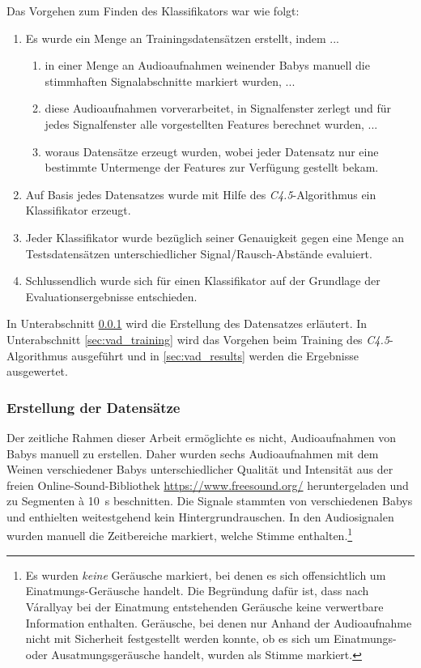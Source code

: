 \pagebreak

Das Vorgehen zum Finden des Klassifikators war wie folgt:
\begin{enumerate}
\item Es wurde ein Menge an Trainingsdatensätzen erstellt, indem ...
	\begin{enumerate}[label*=\arabic*.]
	\item in einer Menge an Audioaufnahmen weinender Babys manuell die stimmhaften Signalabschnitte markiert wurden, ...
	\item diese Audioaufnahmen vorverarbeitet, in Signalfenster zerlegt und für jedes Signalfenster alle vorgestellten Features berechnet wurden, ...
	\item woraus Datensätze erzeugt wurden, wobei jeder Datensatz nur eine bestimmte Untermenge der Features zur Verfügung gestellt bekam.
	\end{enumerate}
\item Auf Basis jedes Datensatzes wurde mit Hilfe des \emph{C4.5}-Algorithmus ein Klassifikator erzeugt.
\item Jeder Klassifikator wurde bezüglich seiner Genauigkeit gegen eine Menge an Testsdatensätzen unterschiedlicher Signal/Rausch-Abstände evaluiert.
\item Schlussendlich wurde sich für einen Klassifikator auf der Grundlage der Evaluationsergebnisse entschieden.
\end{enumerate}

In Unterabschnitt \ref{sec:vad_database} wird die Erstellung des Datensatzes erläutert. In Unterabschnitt \ref{sec:vad_training} wird das Vorgehen beim Training des \emph{C4.5}-Algorithmus ausgeführt und in \autoref{sec:vad_results} werden die Ergebnisse ausgewertet.

\subsubsection{Erstellung der Datensätze}
\label{sec:vad_database}

Der zeitliche Rahmen dieser Arbeit ermöglichte es nicht, Audioaufnahmen von Babys manuell zu erstellen. Daher wurden sechs Audioaufnahmen mit dem Weinen verschiedener Babys unterschiedlicher Qualität und Intensität aus der freien Online-Sound-Bibliothek \url{https://www.freesound.org/} heruntergeladen und zu Segmenten \`{a} \SI{10}{\second} beschnitten. Die Signale stammten von verschiedenen Babys und enthielten weitestgehend kein Hintergrundrauschen. In den Audiosignalen wurden manuell die Zeitbereiche markiert, welche Stimme enthalten.\footnote{Es wurden \emph{keine} Geräusche markiert, bei denen es sich offensichtlich um Einatmungs-Geräusche handelt. Die Begründung dafür ist, dass nach Várallyay \cite[S. 4]{cry_thesis} bei der Einatmung entstehenden Geräusche keine verwertbare Information enthalten. Geräusche, bei denen nur Anhand der Audioaufnahme nicht mit Sicherheit festgestellt werden konnte, ob es sich um Einatmungs- oder Ausatmungsgeräusche handelt, wurden als Stimme markiert.}

